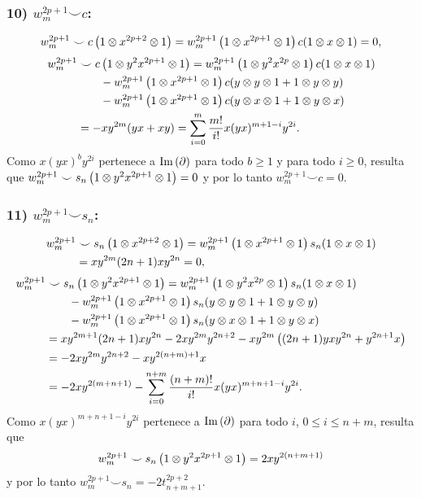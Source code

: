 \documentclass[fleqn,../tesis.tex]{subfiles}
\begin{document}
\subsubsection{10) $w_m^{2p + 1} \smile c$:}
\begin{align*}
	w_m^{2p + 1} \smile c\left(1 \otimes x^{2p + 2} \otimes 1\right)
		= w_m^{2p + 1}\left(1 \otimes x^{2p + 1} \otimes 1\right)c(1 \otimes x \otimes 1) = 0,
\end{align*}
\begin{align*}
	w_m^{2p + 1}& \smile c\left(1 \otimes y^2x^{2p + 1} \otimes 1\right)
		= w_m^{2p + 1}\left(1 \otimes y^2 x^{2p} \otimes 1\right)c(1 \otimes x \otimes 1)\\
	&\qquad- w_m^{2p + 1}\left(1 \otimes x^{2p + 1} \otimes 1\right)c(y \otimes y \otimes 1 + 1 \otimes y \otimes y)\\
	&\qquad -w_m^{2p + 1}\left(1 \otimes x^{2p + 1} \otimes 1\right)c(y \otimes x \otimes 1 + 1 \otimes y \otimes x)\\
	&= -xy^{2m}(yx+ xy) = \sum_{i = 0}^{m}\frac{m!}{i!}x(yx)^{m + 1 - i}y^{2i}.
\end{align*}
Como $x(yx)^{b}y^{2i}$ pertenece a $\operatorname{Im}\left(\partial\right)$ para todo $b\geq 1$ y para todo
$i \geq 0$, resulta que $w_m^{2p + 1}\smile s_n\left(1 \otimes y^2x^{2p + 1} \otimes 1\right) = 0$
y por lo tanto $w_m^{2p + 1} \smile c = 0$.
\subsubsection{11) $w_m^{2p + 1} \smile s_n$:}
\begin{align*}
	w_m^{2p + 1} &\smile s_n\left(1 \otimes x^{2p + 2} \otimes 1\right)
		= w_m^{2p + 1}\left(1 \otimes x^{2p + 1} \otimes 1\right)s_n(1 \otimes x \otimes 1)\\
	&= xy^{2m}(2n + 1)xy^{2n} = 0,
\end{align*}	
\begin{align*}
	w_m^{2p + 1}& \smile s_n\left(1 \otimes y^2x^{2p + 1} \otimes 1\right)
		= w_m^{2p + 1}\left(1 \otimes y^2 x^{2p} \otimes 1\right)s_n(1 \otimes x \otimes 1)\\
	&\qquad -w_m^{2p + 1}\left(1 \otimes x^{2p + 1} \otimes 1\right)s_n(y \otimes y \otimes 1 + 1 \otimes y \otimes y)\\
	&\qquad -w_m^{2p + 1}\left(1 \otimes x^{2p + 1} \otimes 1\right)s_n(y \otimes x \otimes 1 + 1 \otimes y \otimes x)\\
	&= xy^{2m + 1}(2n + 1)xy^{2n} -2xy^{2m}y^{2n + 2} - xy^{2m}\left((2n + 1)yxy^{2n} + y^{2n + 1}x\right)\\
	&= -2xy^{2m}y^{2n + 2} -xy^{2(n + m) + 1}x\\
	&= -2xy^{2(m + n + 1)}
		-\sum_{i = 0}^{n +m}\frac{(n + m)!}{i!}x(yx)^{m  + n  + 1 -i}y^{2i}.
\end{align*}
Como $x(yx)^{m  + n  + 1 -i}y^{2i}$ pertenece a $\operatorname{Im}\left(\partial\right)$ para todo $i$, $0 \leq i \leq n + m$,
resulta que \[w_m^{2p + 1} \smile s_n\left(1 \otimes y^2x^{2p + 1} \otimes 1\right) = 2xy^{2(n + m + 1)}\]
y por lo tanto $w_m^{2p + 1} \smile s_n = -2t_{n + m + 1}^{2p + 2}$.
\end{document}
